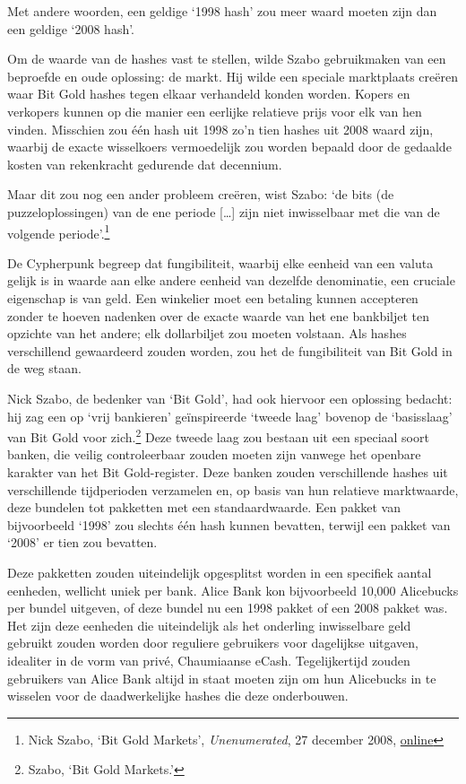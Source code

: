 \documentclass[
  a5paper,
  smalldemyvopaper,11pt,twoside,onecolumn,openright,extrafontsizes]{memoir}
\begin{document}
Met andere woorden, een geldige `1998 hash' zou meer waard moeten zijn
dan een geldige `2008 hash'.

Om de waarde van de hashes vast te stellen, wilde Szabo gebruikmaken van
een beproefde en oude oplossing: de markt. Hij wilde een speciale
marktplaats creëren waar Bit Gold hashes tegen elkaar verhandeld konden
worden. Kopers en verkopers kunnen op die manier een eerlijke relatieve
prijs voor elk van hen vinden. Misschien zou één hash uit 1998 zo'n tien
hashes uit 2008 waard zijn, waarbij de exacte wisselkoers vermoedelijk
zou worden bepaald door de gedaalde kosten van rekenkracht gedurende dat
decennium.

Maar dit zou nog een ander probleem creëren, wist Szabo: `de bits (de
puzzeloplossingen) van de ene periode {[}\ldots{]} zijn niet
inwisselbaar met die van de volgende periode'.\footnote{Nick Szabo, `Bit
  Gold Markets', \emph{Unenumerated}, 27 december 2008,
  \href{https://unenumerated.blogspot.com/2008/04/bit-gold-markets.html}{online}}

De Cypherpunk begreep dat fungibiliteit, waarbij elke eenheid van een
valuta gelijk is in waarde aan elke andere eenheid van dezelfde
denominatie, een cruciale eigenschap is van geld. Een winkelier moet een
betaling kunnen accepteren zonder te hoeven nadenken over de exacte
waarde van het ene bankbiljet ten opzichte van het andere; elk
dollarbiljet zou moeten volstaan. Als hashes verschillend gewaardeerd
zouden worden, zou het de fungibiliteit van Bit Gold in de weg staan.

Nick Szabo, de bedenker van `Bit Gold', had ook hiervoor een oplossing
bedacht: hij zag een op `vrij bankieren' geïnspireerde `tweede laag'
bovenop de `basisslaag' van Bit Gold voor zich.\footnote{Szabo, `Bit
  Gold Markets.'} Deze tweede laag zou bestaan uit een speciaal soort
banken, die veilig controleerbaar zouden moeten zijn vanwege het
openbare karakter van het Bit Gold-register. Deze banken zouden
verschillende hashes uit verschillende tijdperioden verzamelen en, op
basis van hun relatieve marktwaarde, deze bundelen tot pakketten met een
standaardwaarde. Een pakket van bijvoorbeeld `1998' zou slechts één hash
kunnen bevatten, terwijl een pakket van `2008' er tien zou bevatten.

Deze pakketten zouden uiteindelijk opgesplitst worden in een specifiek
aantal eenheden, wellicht uniek per bank. Alice Bank kon bijvoorbeeld
10,000 Alicebucks per bundel uitgeven, of deze bundel nu een 1998 pakket
of een 2008 pakket was. Het zijn deze eenheden die uiteindelijk als het
onderling inwisselbare geld gebruikt zouden worden door reguliere
gebruikers voor dagelijkse uitgaven, idealiter in de vorm van privé,
Chaumiaanse eCash. Tegelijkertijd zouden gebruikers van Alice Bank
altijd in staat moeten zijn om hun Alicebucks in te wisselen voor de
daadwerkelijke hashes die deze onderbouwen.
\end{document}
